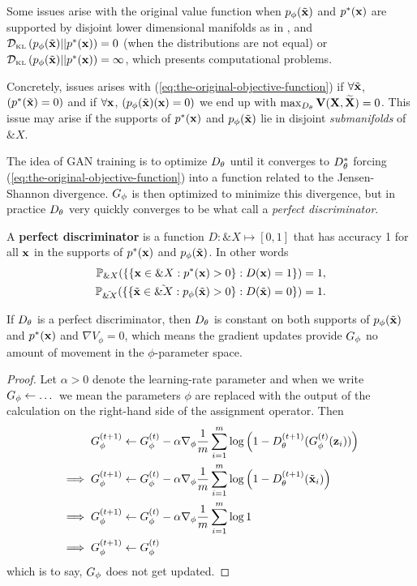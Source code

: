 Some issues arise with the original value function when $p_{\phi}(\tilde{\mathbf{x}})$ and
$p^*(\mathbf{x})$ are supported by disjoint lower dimensional manifolds as in
\cite{ref:arjovsky-towards-2017}, and $\mathcal{D}_{\text{\tiny KL}}\left( p_{\phi}(\tilde{\mathbf{x}}) \middle| \middle| p^*(\mathbf{x}) \right) = 0$ (when the
distributions are not equal) or $\mathcal{D}_{\text{\tiny KL}}\left( p_{\phi}(\tilde{\mathbf{x}}) \middle| \middle| p^*(\mathbf{x}) \right) = \infty$, which
presents computational problems.

Concretely, issues arises with
(\ref{eq:the-original-objective-function}) if $\forall \tilde{\mathbf{x}}$,
$(p^*(\tilde{\mathbf{x}}) = 0)$ and if $\forall \mathbf{x}$, $(p_{\phi}(\tilde{\mathbf{x}})(\mathbf{x}) = 0)$ we end
up with $\max_{D_\theta}\mathbf{V}(\mathbf{X}, \widetilde{\mathbf{X}}) = 0$. This issue may arise
if the supports of $p^*(\mathbf{x})$ and $p_{\phi}(\tilde{\mathbf{x}})$ lie in disjoint
\textit{submanifolds} of $\&X$.

The idea of GAN training is to optimize $D_\theta$ until it converges to
$D_\theta^*$ forcing (\ref{eq:the-original-objective-function}) into a
function related to the Jensen-Shannon divergence.  $G_\phi$ is then
optimized to minimize this divergence, but in practice $D_\theta$ very
quickly converges to be what \cite{ref:arjovsky-towards-2017} call a
\textit{perfect discriminator}.

\begin{definition} A \textbf{perfect discriminator} is a function $D:
  \&X \mapsto [0,1]$ that has accuracy 1 for all $\mathbf{x}$ in the supports
  of $p^*(\mathbf{x})$ and $p_{\phi}(\tilde{\mathbf{x}})$. In other words
  \begin{align} \mathbb{P}_{\&X}(\{\{\mathbf{x} \in \&X : p^*(\mathbf{x}) > 0\} : D(\mathbf{x})
    = 1 \} )= 1, \\ \mathbb{P}_{\tilde{\&X}}(\{\{\tilde{\mathbf{x}} \in
    \tilde{\&X} : p_{\phi}(\tilde{\mathbf{x}}) > 0\} : D(\tilde{\mathbf{x}}) = 0 \} )= 1.
  \end{align}
\end{definition}

\begin{theorem} If $D_\theta$ is a perfect discriminator, then $D_\theta$ is
  constant on both supports of $p_{\phi}(\tilde{\mathbf{x}})$ and $p^*(\mathbf{x})$ and $\nabla{V_\phi} = 0$,
  which means the gradient updates provide $G_\phi$ no amount of movement in
  the $\phi$-parameter space.
\end{theorem}

\begin{proof} Let $\alpha>0$ denote the learning-rate parameter and
  when we write $G_\phi \gets \dots$ we mean the parameters $\phi$ are
  replaced with the output of the calculation on the right-hand side of
  the assignment operator. Then
  \begin{align}
    \label{eq:g-updates-no-good}
    G_\phi^{(t+1)} & \gets G_\phi^{(t)} -
                 \alpha\nabla_\phi {1 \over m} \sum_{i=1}^m \log\left( 1 -
                 D_\theta^{(t+1)}(G_\phi^{(t)}(\mathbf{z}_i)) \right) \\
    \implies G_\phi^{(t+1)} & \gets
                          G_\phi^{(t)} - \alpha\nabla_\phi {1 \over m} \sum_{i=1}^m \log{ \left( 1 -
                          D_\theta^{(t+1)}(\tilde{\mathbf{x}}_i) \right)} \\ \implies
    G_\phi^{(t+1)}
               & \gets
                 G_\phi^{(t)} - \alpha\nabla_\phi {1 \over m} \sum_{i=1}^m \log{1} \\
    \implies G_\phi^{(t+1)}
               & \gets G_\phi^{(t)}
  \end{align} which is to say, $G_\phi$ does not get updated.
\end{proof}

